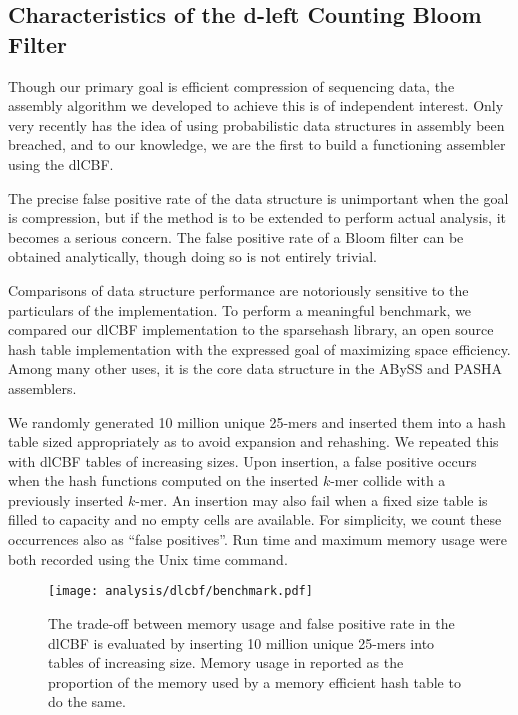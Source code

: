 \documentclass[twocolumn]{article}
\begin{document}
\subsection{Characteristics of the d-left Counting Bloom Filter}

Though our primary goal is efficient compression of sequencing data, the
assembly algorithm we developed to achieve this is of independent interest.
Only very recently has the idea of using probabilistic data structures in
assembly been breached, and to our knowledge, we are the first to build
a functioning assembler using the dlCBF.

The precise false positive rate of the data structure is unimportant when the
goal is compression, but if the method is to be extended to perform actual
analysis, it becomes a serious concern. The false positive rate of a Bloom
filter can be obtained analytically, though doing so is not entirely trivial.

Comparisons of data structure performance are notoriously sensitive to the
particulars of the implementation. To perform a meaningful benchmark, we
compared our dlCBF implementation to the sparsehash library, an open source
hash table implementation with the expressed goal of maximizing space
efficiency. Among many other uses, it is the core data structure in the ABySS
\citep{Simpson2011} and PASHA \citep{Liu2011} assemblers.

We randomly generated 10 million unique 25-mers and inserted them into a hash
table sized appropriately as to avoid expansion and rehashing. We repeated
this with dlCBF tables of increasing sizes. Upon insertion, a false positive
occurs when the hash functions computed on the inserted $k$-mer collide with a
previously inserted $k$-mer. An insertion may also fail when a fixed size
table is filled to capacity and no empty cells are available. For simplicity,
we count these occurrences also as ``false positives''. Run time and maximum memory
usage were both recorded using the Unix time command.

\begin{figure}[h]
\centerline{\texttt{[image: analysis/dlcbf/benchmark.pdf]}}
\caption{
The trade-off between memory usage and false positive rate in the dlCBF is
evaluated by inserting 10 million unique 25-mers into tables of increasing
size. Memory usage in reported as the proportion of the memory used by a
memory efficient hash table to do the same.
}
\label{fig:dlcbf_bench}
\end{figure}
\end{document}
